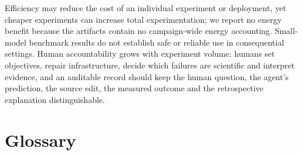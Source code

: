 \documentclass{article}
\begin{document}
Efficiency may reduce the cost of an individual experiment or deployment, yet cheaper experiments can increase total experimentation; we report no energy benefit because the artifacts contain no campaign-wide energy accounting. Small-model benchmark results do not establish safe or reliable use in consequential settings. Human accountability grows with experiment volume: humans set objectives, repair infrastructure, decide which failures are scientific and interpret evidence, and an auditable record should keep the human question, the agent's prediction, the source edit, the measured outcome and the retrospective explanation distinguishable.
\label{partthreeend}

\clearpage
\appendix
\raggedbottom
\raggedright
\setlength{\parskip}{4pt}
\section{Glossary}\label{app:glossary}
\end{document}
